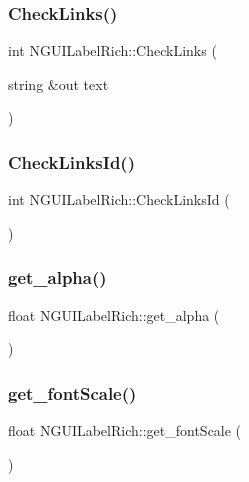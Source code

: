 \subsubsection{\texorpdfstring{Check\+Links()}{CheckLinks()}}
{\footnotesize\ttfamily int N\+G\+U\+I\+Label\+Rich\+::\+Check\+Links (\begin{DoxyParamCaption}\item[{string \&out}]{text }\end{DoxyParamCaption})}

\hypertarget{class_n_g_u_i_label_rich_accc7c441c037d2ded2c314b58cace71a}{}\label{class_n_g_u_i_label_rich_accc7c441c037d2ded2c314b58cace71a} 
\subsubsection{\texorpdfstring{Check\+Links\+Id()}{CheckLinksId()}}
{\footnotesize\ttfamily int N\+G\+U\+I\+Label\+Rich\+::\+Check\+Links\+Id (\begin{DoxyParamCaption}{ }\end{DoxyParamCaption})}

\hypertarget{class_n_g_u_i_label_rich_aac149e2d157706f311cdacd26474aeac}{}\label{class_n_g_u_i_label_rich_aac149e2d157706f311cdacd26474aeac} 
\subsubsection{\texorpdfstring{get\+\_\+alpha()}{get\_alpha()}}
{\footnotesize\ttfamily float N\+G\+U\+I\+Label\+Rich\+::get\+\_\+alpha (\begin{DoxyParamCaption}{ }\end{DoxyParamCaption})}

\hypertarget{class_n_g_u_i_label_rich_ac1a30d7a84e860dab05894fdf38b7173}{}\label{class_n_g_u_i_label_rich_ac1a30d7a84e860dab05894fdf38b7173} 
\subsubsection{\texorpdfstring{get\+\_\+font\+Scale()}{get\_fontScale()}}
{\footnotesize\ttfamily float N\+G\+U\+I\+Label\+Rich\+::get\+\_\+font\+Scale (\begin{DoxyParamCaption}{ }\end{DoxyParamCaption})}

